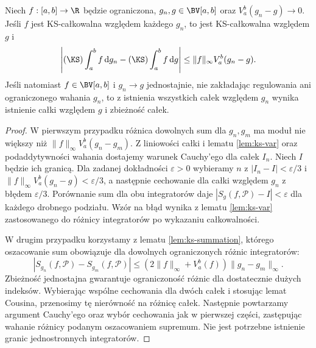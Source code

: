 \begin{twierdzenie}\label{ma1:kh:thm:ks-integrator-limit}
Niech $f:[a,b]\to\R$ będzie ograniczona, $g_n,g\in\BV[a,b]$ oraz $V_a^b(g_n-g)\to0$. Jeśli $f$ jest KS-całkowalna względem każdego $g_n$, to jest KS-całkowalna względem $g$ i
\[
 \left|(\KS)\int_a^b f\,\mathrm dg_n-(\KS)\int_a^b f\,\mathrm dg\right|
 \le\|f\|_\infty V_a^b(g_n-g).
\]
Jeśli natomiast $f\in\BV[a,b]$ i $g_n\to g$ jednostajnie, nie zakładając regulowania ani ograniczonego wahania $g_n$, to z istnienia wszystkich całek względem $g_n$ wynika istnienie całki względem $g$ i zbieżność całek.
\end{twierdzenie}
\begin{proof}
W pierwszym przypadku różnica dowolnych sum dla $g_n,g_m$ ma moduł nie większy niż $\|f\|_\infty V_a^b(g_n-g_m)$. Z liniowości całki i lematu \ref{lem:ks-var} oraz podaddytywności wahania dostajemy warunek Cauchy'ego dla całek $I_n$. Niech $I$ będzie ich granicą. Dla zadanej dokładności $\varepsilon>0$ wybieramy $n$ z $|I_n-I|<\varepsilon/3$ i $\|f\|_\infty V_a^b(g_n-g)<\varepsilon/3$, a następnie cechowanie dla całki względem $g_n$ z błędem $\varepsilon/3$. Porównanie sum dla obu integratorów daje $|S_g(f,\mathcal P)-I|<\varepsilon$ dla każdego drobnego podziału. Wzór na błąd wynika z lematu \ref{lem:ks-var} zastosowanego do różnicy integratorów po wykazaniu całkowalności.

W drugim przypadku korzystamy z lematu \ref{lem:ks-summation}, którego oszacowanie sum obowiązuje dla dowolnych ograniczonych różnic integratorów:
\[
 |S_{g_n}(f,\mathcal P)-S_{g_m}(f,\mathcal P)|
 \le (2\|f\|_\infty+V_a^b(f))\|g_n-g_m\|_\infty.
\]
Zbieżność jednostajna gwarantuje ograniczoność różnic dla dostatecznie dużych indeksów. Wybierając wspólne cechowania dla dwóch całek i stosując lemat Cousina, przenosimy tę nierówność na różnicę całek. Następnie powtarzamy argument Cauchy'ego oraz wybór cechowania jak w pierwszej części, zastępując wahanie różnicy podanym oszacowaniem supremum. Nie jest potrzebne istnienie granic jednostronnych integratorów.
\end{proof}

